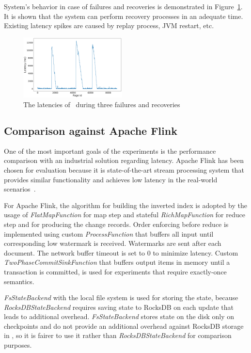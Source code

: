 System's behavior in case of failures and recoveries is demonstrated in Figure~\ref{recovery}. It is shown that the system can perform recovery processes in an adequate time. Existing latency spikes are caused by replay process, JVM restart, etc.

\begin{figure}[htbp]
  \centering
  \includegraphics[width=0.48\textwidth]{pics/blink}
  \caption{The latencies of \FlameStream\ during three failures and recoveries}
  \label {recovery}
\end{figure}

\subsection{Comparison against Apache Flink}
One of the most important goals of the experiments is the performance comparison with an industrial solution regarding latency. Apache Flink has been chosen for evaluation because it is state-of-the-art stream processing system that provides similar functionality and achieves low latency in the real-world scenarios~\cite{S7530084}. 

For Apache Flink, the algorithm for building the inverted index is adopted by the usage of {\it FlatMapFunction} for map step and stateful {\it RichMapFunction} for reduce step and for producing the change records. Order enforcing before reduce is implemented using custom {\it ProcessFunction} that buffers all input until corresponding low watermark is received. Watermarks are sent after each document. The network buffer timeout is set to 0 to minimize latency. Custom {\it TwoPhaseCommitSinkFunction} that buffers output items in memory until a transaction is committed, is used for experiments that require exactly-once semantics. 

{\it FsStateBackend} with the local file system is used for storing the state, because {\it RocksDBStateBackend} requires saving state to RocksDB on each update that leads to additional overhead. {\it FsStateBackend} stores state on the disk only on checkpoints and do not provide an additional overhead against RocksDB storage in \FlameStream, so it is fairer to use it rather than {\it RocksDBStateBackend} for comparison purposes.

